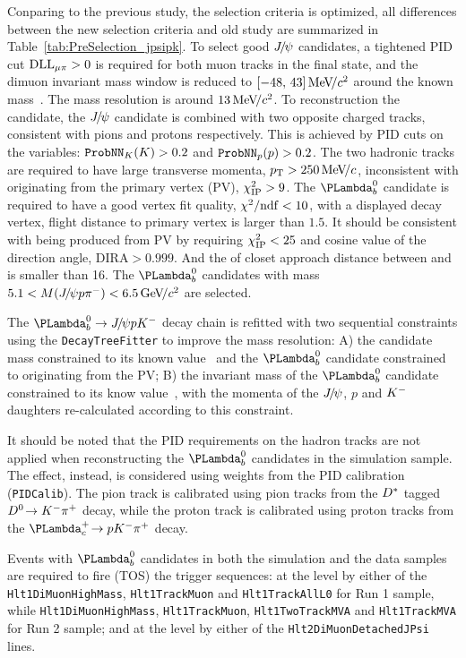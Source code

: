 %
Conparing to the previous study\supercite{LHCb-PAPER-2015-024},
the selection criteria is optimized,
all differences between the new selection criteria and old study are summarized in Table~\ref{tab:PreSelection_jpsipk}.
To select good ${{J\mskip -3mu/\mskip -2mu\psi}}$ candidates,
a tightened PID cut $\mathrm{DLL}_{{\mu}\pi}>0$ is required for both muon tracks in the final state,
and the dimuon invariant mass window is reduced to $[-48,\,43]\text{\,Me\kern -0.1em V\!/}c^2$ around the known \jpsi mass~\supercite{PDG2020}.
The \jpsi mass resolution is around $13\text{\,Me\kern -0.1em V\!/}c^2$.
To reconstruction the \Lb candidate, 
the ${{J\mskip -3mu/\mskip -2mu\psi}}$ candidate is combined with two opposite charged tracks, 
consistent with pions and protons respectively.
This is achieved by PID cuts on the \ProbNN variables: $\mbox{\texttt{ProbNN}}_{K}(K)>0.2$ and $\mbox{\texttt{ProbNN}}_{p}(p)>0.2$.
The two hadronic tracks are required to have large transverse momenta, $p_{\mathrm{T}}>250\text{\,Me\kern -0.1em V\!/}c$,
inconsistent with originating from the primary vertex (PV), $\chi^2_{\text{IP}}>9$.
The $\Lb$ candidate is required to have a good vertex fit quality, $\chi^2/\mathrm{ndf}<10$,
with a displayed decay vertex,
flight distance to primary vertex is larger than $1.5$\mm.
It should be consistent with being produced from PV by requiring $\chi^2_{\text{IP}}<25$ and cosine value of the direction angle, DIRA$>0.999$.
And the \chisq of closet approach distance between \proton and \Km is smaller than 16.
The $\Lb$ candidates with mass $5.1<M({{J\mskip -3mu/\mskip -2mu\psi}} p\pi^-)<6.5 \text{\,Ge\kern -0.1em V\!/}c^2$ are selected.

The $\Lb\to\jpsi\proton\Km$ decay chain is refitted with two sequential constraints using the \texttt{DecayTreeFitter} to improve the mass resolution:
A) the \jpsi candidate mass constrained to its known value~\supercite{PDG2020} and
the $\Lb$ candidate constrained to originating from the PV;
B) the invariant mass of the $\Lb$ candidate constrained to its know value~\supercite{PDG},
with the momenta of the ${{J\mskip -3mu/\mskip -2mu\psi}}$, $p$ and ${{K}^-}$ daughters re-calculated according to this constraint.

It should be noted that the PID requirements on the hadron tracks are not applied when reconstructing the $\Lb$ candidates in the simulation sample.
The effect, instead, is considered using weights from the PID calibration (\texttt{PIDCalib}).
The pion track is calibrated using pion tracks from the ${{D}^*}$ tagged ${{D}^0}\!\rightarrow {\ensuremath{{K}^-}}{\ensuremath{{\pi}^+}}$ decay,
while the proton track is calibrated using proton tracks from the $\decay{\Lc}{p\Km\pip}$ decay.

Events with $\Lb$ candidates in both the simulation and the data samples are required to fire (TOS) the trigger sequences:
at the \hltone level by either of the \texttt{Hlt1DiMuonHighMass}, \texttt{Hlt1TrackMuon} and \texttt{Hlt1TrackAllL0} for Run 1 sample,
while \texttt{Hlt1DiMuonHighMass}, \texttt{Hlt1TrackMuon}, \texttt{Hlt1TwoTrackMVA} and \texttt{Hlt1TrackMVA} for Run 2 sample;
and at the \hlttwo level by either of
the \texttt{Hlt2DiMuonDetachedJPsi} lines.


